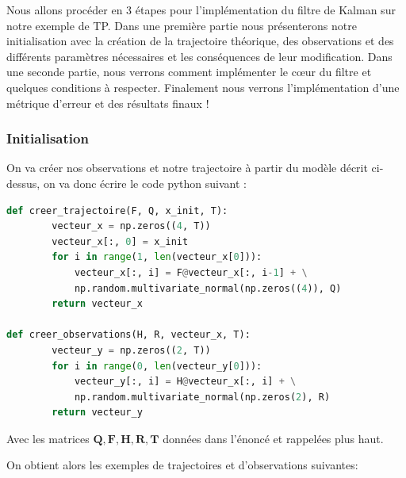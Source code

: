 Nous allons procéder en 3 étapes pour l'implémentation du filtre de Kalman sur notre exemple de TP. \newline
Dans une première partie nous présenterons notre initialisation avec la création de la trajectoire théorique, des observations et des différents paramètres nécessaires et les conséquences de leur modification. \newline
Dans une seconde partie, nous verrons comment implémenter le cœur du filtre et quelques conditions à respecter. \newline
Finalement nous verrons l'implémentation d'une métrique d'erreur et des résultats finaux !


\newpage

\subsubsection{Initialisation}

On va créer nos observations et notre trajectoire à partir du modèle décrit ci-dessus, on va donc écrire le code python suivant :

\begin{lstlisting}[language=Python, caption=Initialisation du filter]
def creer_trajectoire(F, Q, x_init, T):
		vecteur_x = np.zeros((4, T))
		vecteur_x[:, 0] = x_init
		for i in range(1, len(vecteur_x[0])):
			vecteur_x[:, i] = F@vecteur_x[:, i-1] + \
			np.random.multivariate_normal(np.zeros((4)), Q)
		return vecteur_x

def creer_observations(H, R, vecteur_x, T):
		vecteur_y = np.zeros((2, T))
		for i in range(0, len(vecteur_y[0])):
			vecteur_y[:, i] = H@vecteur_x[:, i] + \
			np.random.multivariate_normal(np.zeros(2), R)
		return vecteur_y
\end{lstlisting}

Avec les matrices $\mathbf{Q}, \mathbf{F}, \mathbf{H}, \mathbf{R}, \mathbf{T}$ données dans l'énoncé et rappelées plus haut.

On obtient alors les exemples de trajectoires et d'observations suivantes:


